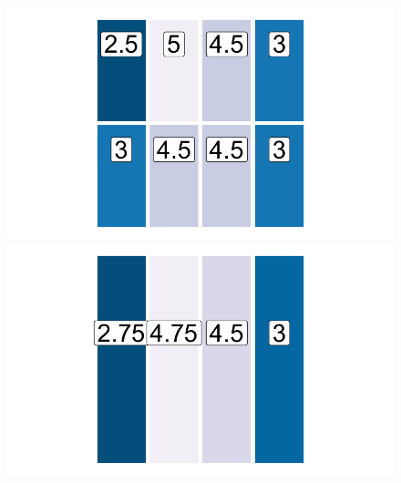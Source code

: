 \begin{figure}[htb] %
    \centering %
    \begin{minipage}[b]{.32\linewidth} %
        \includegraphics[width=\linewidth,trim={0.5cm 0.5cm 0.5cm 0.5cm},clip]{body/figures/47-zon_d.pdf} %
    \end{minipage} %
    \hfill
    \begin{minipage}[b]{.32\linewidth}
       \includegraphics[width=\linewidth,trim={0.5cm 0.5cm 0.5cm 0.5cm},clip]{body/figures/48-zon_e.pdf}

\end{minipage}
\end{figure}
